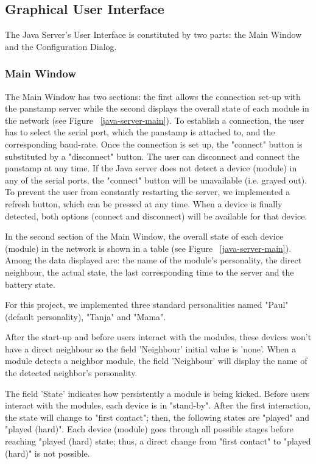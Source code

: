 \subsection{Graphical User Interface}

The Java Server's User Interface is constituted by two parts: the Main Window and the Configuration Dialog.

\subsubsection{Main Window}

The Main Window has two sections: the first allows the connection set-up with the panstamp server while the second displays the overall state of each module in the network (see Figure ~\ref{java-server-main}). 
To establish a connection, the user has to select the serial port, which the panstamp is attached to, and the corresponding baud-rate. Once the connection is set up, the "connect" button is substituted by a "disconnect" button. The user can disconnect and connect the panstamp at any time. 
If the Java server does not detect a device (module) in any of the serial ports, the "connect" button will be unavailable (i.e. grayed out). To prevent the user from constantly restarting the server, we implemented a refresh button, which can be pressed at any time. When a device is finally detected, both options (connect and disconnect) will be available for that device.

In the second section of the Main Window, the overall state of each device (module) in the network is shown in a table (see Figure ~\ref{java-server-main}). 
Among the data displayed are: the name of the module's personality, the direct neighbour, the actual state, the last corresponding time to the server and the battery state. 

For this project, we implemented three standard personalities named "Paul" (default personality), "Tanja" and "Mama".

After the start-up and before users interact with the modules, these devices won't have a direct neighbour so the field 'Neighbour' initial value is 'none'. When a module detects a neighbor module, the field 'Neighbour' will display the name of the detected neighbor's personality.
 
The field 'State' indicates how persistently a module is being kicked.
Before users interact with the modules, each device is in "stand-by". After the first interaction, the state will change to "first contact"; then, the following states are "played" and "played (hard)". Each device (module) goes through all possible stages before reaching "played (hard) state; thus, a direct change from "first contact" to "played (hard)" is not possible.

